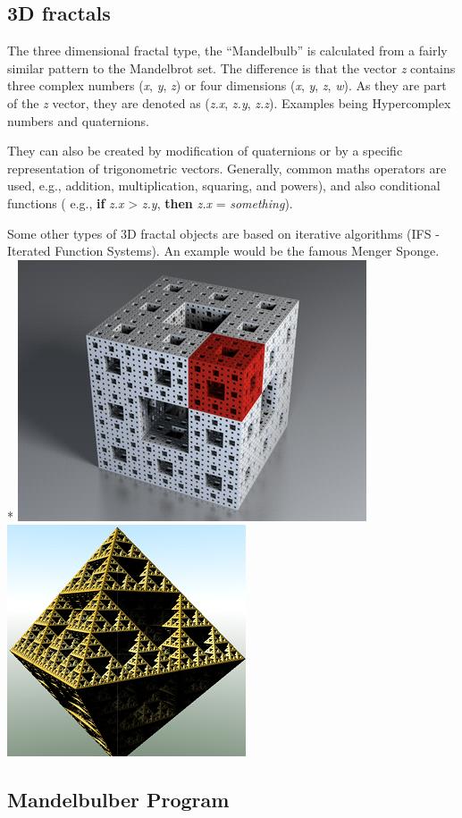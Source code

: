 \subsection{3D fractals}\label{d-fractals}

The three dimensional fractal type, the ``Mandelbulb'' is calculated from a
fairly similar pattern to the Mandelbrot set. The difference is that the vector
\emph{z} contains three complex numbers (\emph{x}, \emph{y}, \emph{z}) or four
dimensions (\emph{x}, \emph{y}, \emph{z}, \emph{w}). As they are part of the
\emph{z} vector, they are denoted as (\emph{z.x}, \emph{z.y}, \emph{z.z}).
Examples being Hypercomplex numbers and quaternions.

They can also be created by modification of quaternions or by a specific
representation of trigonometric vectors. Generally, common maths operators are
used, e.g., addition, multiplication, squaring, and powers), and also
conditional functions ( e.g., \textbf{if} \emph{z.x} \textgreater{} \emph{z.y},
\textbf{then} \emph{z.x} = \emph{something}).

Some other types of 3D fractal objects are based on iterative algorithms (IFS -
Iterated Function Systems). An example would be the famous Menger Sponge.\\*
\includegraphics[height=0.4\linewidth]{img/manual/media/menger_sponge.png} \includegraphics[height=0.4\linewidth]{img/manual/media/sierpinski.png}

\subsection{Mandelbulber Program}\label{mandelbulber-program}

